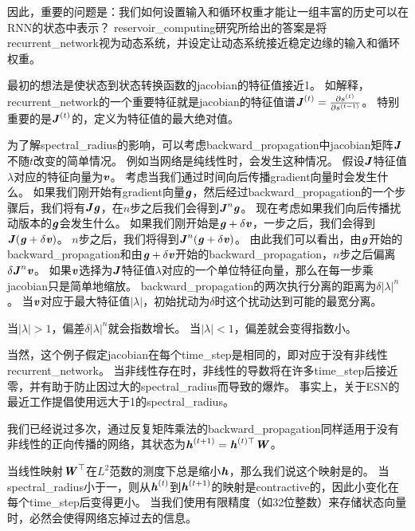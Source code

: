 因此，重要的问题是：我们如何设置输入和循环权重才能让一组丰富的历史可以在\gls{RNN}的状态中表示？
\gls{reservoir_computing}研究所给出的答案是将\gls{recurrent_network}视为动态系统，并设定让动态系统接近稳定边缘的输入和循环权重。

最初的想法是使状态到状态转换函数的\gls{jacobian}的特征值接近1。
如解释，\gls{recurrent_network}的一个重要特征就是\gls{jacobian}的特征值谱$\boldsymbol{\mathit{J}}^{(t)} = \frac{\partial s^{(t)}}{\partial s^{(t-1)}}$。
特别重要的是$\boldsymbol{\mathit{J}}^{(t)}$的，定义为特征值的最大绝对值。

为了解\gls{spectral_radius}的影响，可以考虑\gls{backward_propagation}中\gls{jacobian}矩阵$\boldsymbol{\mathit{J}}$不随$t$改变的简单情况。
例如当网络是纯线性时，会发生这种情况。
假设$\boldsymbol{\mathit{J}}$特征值$\lambda$对应的特征向量为$\boldsymbol{\mathit{v}}$。
考虑当我们通过时间向后传播\gls{gradient}向量时会发生什么。
如果我们刚开始有\gls{gradient}向量$\boldsymbol{\mathit{g}}$，然后经过\gls{backward_propagation}的一个步骤后，我们将有$\boldsymbol{\mathit{J}} \boldsymbol{\mathit{g}}$，在$n$步之后我们会得到$\boldsymbol{\mathit{J}}^n \boldsymbol{\mathit{g}}$。
现在考虑如果我们向后传播扰动版本的$\boldsymbol{\mathit{g}}$会发生什么。
如果我们刚开始是$\boldsymbol{\mathit{g}} + \delta \boldsymbol{\mathit{v}}$，一步之后，我们会得到$\boldsymbol{\mathit{J}}(\boldsymbol{\mathit{g}} + \delta \boldsymbol{\mathit{v}})$。
$n$步之后，我们将得到$\boldsymbol{\mathit{J}}^n(\boldsymbol{\mathit{g}} + \delta \boldsymbol{\mathit{v}})$。
由此我们可以看出，由$\boldsymbol{\mathit{g}}$开始的\gls{backward_propagation}和由$\boldsymbol{\mathit{g}}+\delta \boldsymbol{\mathit{v}}$开始的\gls{backward_propagation}，$n$步之后偏离$\delta \boldsymbol{\mathit{J}}^n \boldsymbol{\mathit{v}}$。
如果$\boldsymbol{\mathit{v}}$选择为$\boldsymbol{\mathit{J}}$特征值$\lambda$对应的一个单位特征向量，那么在每一步乘\gls{jacobian}只是简单地缩放。
\gls{backward_propagation}的两次执行分离的距离为$\delta | \lambda |^n$。
当$\boldsymbol{\mathit{v}}$对应于最大特征值$|\lambda|$，初始扰动为$\delta$时这个扰动达到可能的最宽分离。

当$ | \lambda | > 1$，偏差$\delta | \lambda |^n$就会指数增长。
当$ | \lambda | < 1$，偏差就会变得指数小。


当然，这个例子假定\gls{jacobian}在每个\gls{time_step}是相同的，即对应于没有非线性\gls{recurrent_network}。
当非线性存在时，非线性的导数将在许多\gls{time_step}后接近零，并有助于防止因过大的\gls{spectral_radius}而导致的爆炸。
事实上，关于\gls{ESN}的最近工作提倡使用远大于1的\gls{spectral_radius}\citep{yildiz2012re,jaeger2012long}。

我们已经说过多次，通过反复矩阵乘法的\gls{backward_propagation}同样适用于没有非线性的正向传播的网络，其状态为$\boldsymbol{\mathit{h}}^{(t+1)} = \boldsymbol{\mathit{h}}^{(t)\top} \boldsymbol{\mathit{W}} $。

当线性映射$\boldsymbol{\mathit{W}}^\top$在$L^2$范数的测度下总是缩小$\boldsymbol{\mathit{h}}$，那么我们说这个映射是的。
当\gls{spectral_radius}小于一，则从$\boldsymbol{\mathit{h}}^{(t)}$到$\boldsymbol{\mathit{h}}^{(t+1)}$的映射是\gls{contractive}的，因此小变化在每个\gls{time_step}后变得更小。
当我们使用有限精度（如32位整数）来存储状态向量时，必然会使得网络忘掉过去的信息。

